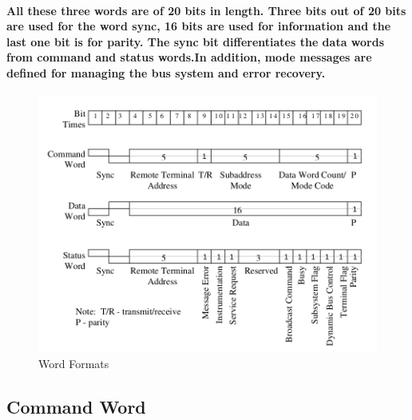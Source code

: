 \documentclass[12pt,a4paper]{report}
\begin{document}
\paragraph{\textrm{\textmd {All these three words are of 20 bits in length. Three bits out of 20 bits are used for the word sync, 16 bits are used for information and the last one bit is for parity. The sync bit differentiates the data words from command and status words.In addition, mode messages are defined for managing the bus system and error recovery.}}}
\begin{figure}[h]
	\centering
	\includegraphics[scale=.35]{word.png}
	\caption{Word Formats}
	\label{fig:word}
\end{figure}
\subsection{Command Word}
\end{document}
